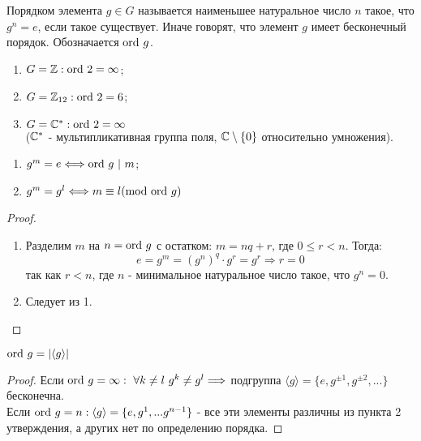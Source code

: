 \begin{definition}
    Порядком элемента $g \in G$ называется наименьшее натуральное число $n$ такое, что $g^n = e$, если такое существует. Иначе говорят, что элемент $g$ имеет бесконечный порядок. Обозначается $\textup{ord} \ g$.
\end{definition}
\begin{examples} \tab
    \begin{enumerate}
        \item $G = \mathbb{Z}: \textup{ord } 2 = \infty$;
        \item $G = \mathbb{Z}_{12}: \textup{ord } 2 = 6$;
        \item $G = \mathbb{C}^*: \textup{ord } 2 = \infty$\\
        ($\mathbb{C}^*$ - мультипликативная группа поля, $\mathbb{C}\setminus\{0\}$ относительно умножения).
    \end{enumerate}
\end{examples}
\begin{subtheoremnum}\tab
    \begin{enumerate}
        \item $g^m = e \Longleftrightarrow \textup{ord } g \ | \ m$;
        \item $g^m = g^l \Longleftrightarrow m \equiv l (\textup{mod ord } g)$
    \end{enumerate}
\end{subtheoremnum}
\begin{proof} \tab
    \begin{enumerate}
        \item Разделим $m$ на $n = \textup{ord } g$ с остатком: $m = nq + r$, где $0 \leqslant r < n$. Тогда:
        $$e = g^m = (g^n)^q \cdot g^r = g^r \Longrightarrow r = 0$$
        так как $r < n$, где $n$ - минимальное натуральное число такое, что $g^n = 0$.
        \item Следует из 1. 
    \end{enumerate}
\end{proof}
\begin{consequense}
    $\textup{ord } g = |\langle g \rangle|$
\end{consequense}
\begin{proof}
    Если $\textup{ord } g = \infty: \ \forall k \neq l \ g^k \neq g^l \Longrightarrow$ подгруппа $\langle g \rangle = \{e, g^{\pm 1}, g^{\pm 2},...\}$ бесконечна.\\
    Если $\textup{ord } g = n: \langle g \rangle = \{e, g^1, ... g^{n-1}\}$ - все эти элементы различны из пункта 2 утверждения, а других нет по определению порядка.
\end{proof}
